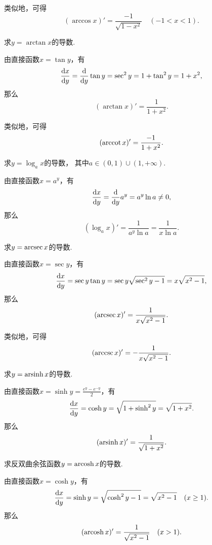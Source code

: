 类似地，可得\[
	(\arccos x)' = \frac{-1}{\sqrt{1 - x^2}}
	\quad(-1<x<1).
\]

\begin{example}
求\(y=\arctan x\)的导数.
\begin{solution}
由直接函数\(x=\tan y\)，有\[
	\dv{x}{y}
	= \dv{y} \tan y
	= \sec^2 y
	= 1 + \tan^2 y
	= 1 + x^2,
\]
那么\[
	(\arctan x)' = \frac1{1+x^2}.
\]
\end{solution}
\end{example}

类似地，可得\[
	(\arccot x)' = \frac{-1}{1+x^2}.
\]

\begin{example}
求\(y=\log_a x\)的导数，
其中\(a\in(0,1)\cup(1,+\infty)\).
\begin{solution}
由直接函数\(x=a^y\)，有\[
	\dv{x}{y} = \dv{y} a^y = a^y \ln a \neq 0,
\]
那么\[
	(\log_a x)' = \frac1{a^y \ln a} = \frac1{x \ln a}.
\]
\end{solution}
\end{example}

\begin{example}
求\(y = \arcsec x\)的导数.
\begin{solution}
由直接函数\(x=\sec y\)，有\[
	\dv{x}{y}
	= \sec y \tan y
	= \sec y \sqrt{\sec^2 y-1}
	= x \sqrt{x^2-1},
\]
那么\[
	(\arcsec x)'
	= \frac1{x \sqrt{x^2-1}}.
\]
\end{solution}
\end{example}

类似地，可得\[
	(\arccsc x)'
	= -\frac1{x \sqrt{x^2-1}}.
\]

\begin{example}
求\(y = \operatorname{arsinh} x\)的导数.
\begin{solution}
由直接函数\(x = \sinh y = \frac{e^y - e^{-y}}2\)，有\[
	\dv{x}{y}
	= \cosh y
	= \sqrt{1 + \sinh^2 y}
	= \sqrt{1 + x^2}.
\]
那么\[
	(\operatorname{arsinh} x)' = \frac1{\sqrt{1+x^2}}.
\]
\end{solution}
\end{example}

\begin{example}
求反双曲余弦函数\(y = \operatorname{arcosh} x\)的导数.
\begin{solution}
由直接函数\(x = \cosh y\)，有\[
	\dv{x}{y}
	= \sinh y
	= \sqrt{\cosh^2 y - 1}
	= \sqrt{x^2 - 1}
	\quad(x\geq1).
\]
那么\[
	(\operatorname{arcosh} x)' = \frac1{\sqrt{x^2-1}}
	\quad(x>1).
\]
\end{solution}
\end{example}

